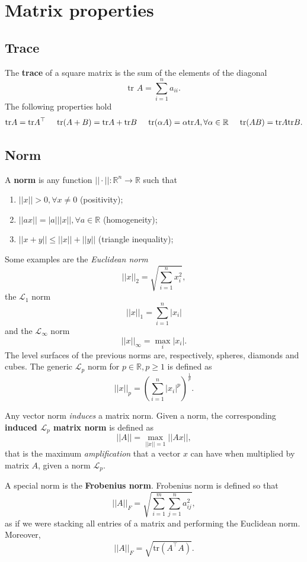 \documentclass[10pt]{report}
\begin{document}
\section{Matrix properties}
\label{sec:orgafcd4bd}
\subsection{Trace}
\label{sec:org6f63679}
The \textbf{trace} of a square matrix is the sum of the elements of the diagonal $$\mbox{tr }A = \sum_{i=1}^n a_{ii}.$$ The following properties hold
$$\mbox{tr} A = \mbox{tr}A^\top \hspace*{0.5cm} \mbox{tr}(A + B) = \mbox{tr}A + \mbox{tr}B \hspace*{0.5cm} \mbox{tr}(\alpha A) = \alpha\mbox{tr}A, \forall \alpha \in \mathbb R \hspace*{0.5cm} \mbox{tr}(AB) = \mbox{tr}A\mbox{tr}B.$$
\subsection{Norm}
\label{sec:org7e9cc7e}
A \textbf{norm} is any function \(||\cdot||:\mathbb{R}^n \longrightarrow \mathbb{R}\) such that
\begin{enumerate}
\item \(||x|| > 0, \forall x\neq 0\) (positivity);
\item \(||ax|| = |a|||x||, \forall a \in \mathbb R\) (homogeneity);
\item \(||x + y|| \leq ||x|| + ||y||\) (triangle inequality);
\end{enumerate}

Some examples are the \emph{Euclidean norm} $$||x||_2 = \sqrt{\sum_{i=1}^n x^2_i},$$ the \(\mathcal {L}_1\) norm $$||x||_1 = \sum_{i=1}^n |x_i|$$ and the \(\mathcal{L}_\infty\) norm $$||x||_\infty = \max_{i}|x_i|.$$ The level surfaces of the previous norms are, respectively, spheres, diamonds and cubes. The generic \(\mathcal{L}_p\) norm for \(p\in \mathbb R, p \geq 1\) is defined as $$||x||_p = \left(\sum_{i=1}^n |x_i|^p\right)^{\frac 1 p}.$$

Any vector norm \emph{induces} a matrix norm. Given a norm, the corresponding \textbf{induced \(\mathcal{L}_p\) matrix norm} is defined as $$||A|| = \max_{||x||=1}||Ax||,$$ that is the maximum \emph{amplification} that a vector \(x\) can have when multiplied by matrix \(A\), given a norm \(\mathcal{L}_p\).

A special norm is the \textbf{Frobenius norm}. Frobenius norm is defined so that $$||A||_F = \sqrt{\sum_{i=1}^m\sum_{j=1}^n a_{ij}^2},$$ as if we were stacking all entries of a matrix and performing the Euclidean norm. Moreover, $$||A||_F = \sqrt{\mbox{tr}(A^\top A)}.$$
\end{document}

